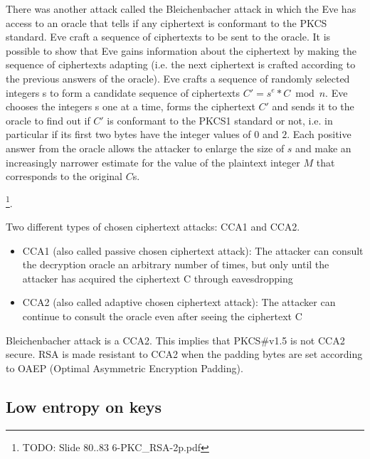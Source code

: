 There was another attack called the Bleichenbacher attack in which the Eve has access to an oracle that tells if any ciphertext is conformant to the PKCS standard. Eve craft a sequence of ciphertexts to be sent to the oracle. It is possible to show that Eve gains information about the ciphertext by making the sequence of ciphertexts adapting (i.e. the next ciphertext is crafted according to the previous answers of the oracle).
Eve crafts a sequence of randomly selected integers s to form a candidate
sequence of ciphertexts $C' = s^e * C \bmod n$.
Eve chooses the integers s one at a time, forms the ciphertext $C'$ and sends it to the oracle to find out if $C'$ is conformant to the PKCS1 standard or not, i.e. in particular if its first two bytes have the integer values of $0$ and $2$.  Each positive answer from the oracle allows the attacker to enlarge the size of $s$ and make an increasingly narrower estimate for the value of the plaintext integer $M$ that corresponds to the original $C$s.

\footnote{TODO: Slide 80..83 6-PKC\_RSA-2p.pdf}.

Two different types of chosen ciphertext attacks: CCA1 and CCA2. 
\begin{itemize}
	\item CCA1 (also called passive chosen ciphertext attack): The attacker can consult the decryption oracle an arbitrary number of times, but only until the attacker has acquired the ciphertext C through eavesdropping
	\item CCA2 (also called adaptive chosen ciphertext attack): The attacker can continue to consult the oracle even after seeing the ciphertext C
\end{itemize}

Bleichenbacher attack is a CCA2. This implies that PKCS\#v1.5 is not CCA2 secure. RSA is made resistant to CCA2 when the padding bytes are set according to OAEP (Optimal Asymmetric Encryption Padding).

\subsection{Low entropy on keys}

